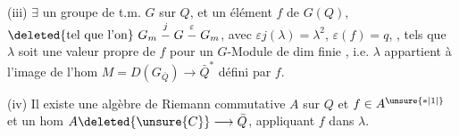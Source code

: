 (iii) $\exists$ un groupe de t.m. $G$ sur $Q$, et un élément $f$ de $G(Q)$,
$\deleted{\text{tel que l'on}}\ G_m\mathrel{\mathop{-}\limits^{j}}G\mathrel{\mathop{-}\limits^\varepsilon}G_m$, avec $\varepsilon j(\lambda)=\lambda^2$,
$\varepsilon(f)=q$, , tels que $\lambda$ soit une valeur propre de $f$
pour un $G$-Module de dim finie  , i.e.
$\lambda$ appartient à l'image de l'hom $M=D(G_{\bar Q})\longrightarrow\bar Q^*$
défini par $f$.

(iv) Il existe une algèbre de Riemann commutative $A$ sur $Q$ et $f\in A^{\unsure{*|1|{}}}$
et un hom $A\deleted{\unsure{C}}\longrightarrow\bar Q$, appliquant $f$ dans $\lambda$.

